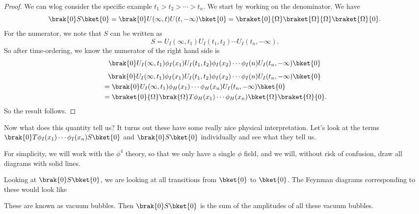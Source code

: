 \documentclass[a4paper]{article}
\begin{document}
\begin{proof}
  We can wlog consider the specific example $t_1 > t_2 > \cdots > t_n$. We start by working on the denominator. We have
  \[
    \brak{0}S\bket{0} = \brak{0}U(\infty, t) U(t, -\infty)\bket{0} = \braket{0}{\Omega}\braket{\Omega}{\Omega}\braket{\Omega}{0}.
  \]
  For the numerator, we note that $S$ can be written as
  \[
    S = U_I(\infty, t_1) U_I(t_1, t_2) \cdots U_I(t_n, -\infty).
  \]
  So after time-ordering, we know the numerator of the right hand side is
  \[
    \brak{0}U_I(\infty, t_1) \phi_I(x_1) U_I(t_1, t_2) \phi_I(x_2) \cdots \phi_I(n)U_I(t_n, -\infty)\bket{0}
  \]
  \begin{align*}
    &\hphantom{=}\brak{0}U_I(\infty, t_1) \phi_I(x_1) U_I(t_1, t_2) \phi_I(x_2) \cdots \phi_I(n)U_I(t_n, -\infty)\bket{0}\\
    &=\brak{0}U_I(\infty, t_1) \phi_H(x_1) \cdots \phi_H(x_n) U_I(t_n, -\infty)\bket{0}\\
    &=\braket{0}{\Omega}\brak{\Omega}T \phi_H(x_1) \cdots \phi_H(x_n)\bket{\Omega}\braket{\Omega}{0}.
  \end{align*}
  So the result follows. %
\end{proof}

Now what does this quantity tell us? It turns out these have some really nice physical interpretation. Let's look at the terms $\brak{0}T \phi_I(x_1) \cdots \phi_I(x_n) S \bket{0}$ and $\brak{0}S\bket{0}$ individually and see what they tell us.

For simplicity, we will work with the $\phi^4$ theory, so that we only have a single $\phi$ field, and we will, without risk of confusion, draw all diagrams with solid lines.

Looking at $\brak{0}S\bket{0}$, we are looking at all transitions from $\bket{0}$ to $\bket{0}$. The Feynman diagrams corresponding to these would look like
\begin{center}
\end{center}
These are known as vacuum bubbles. Then $\brak{0}S\bket{0}$ is the sum of the amplitudes of all these vacuum bubbles.
\end{document}
